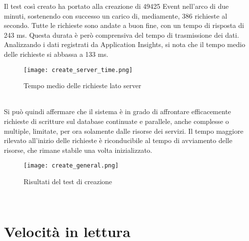 Il test così creato ha portato alla creazione di 49425 Event
nell'arco di due minuti, sostenendo con successo un carico di, mediamente,
386 richieste al secondo.
Tutte le richieste sono andate a buon fine, con un tempo di risposta di 243 ms.
Questa durata è però comprensiva del tempo di trasmissione dei dati.
Analizzando i dati registrati da Application Insights,
si nota che il tempo medio delle richieste si abbassa a 133 ms.\\
\begin{figure}[htbp]
    \begin{center}
        \texttt{[image: create\_server\_time.png]}
        \caption{Tempo medio delle richieste lato server}
    \end{center}
\end{figure}
\\
Si può quindi affermare che il sistema è in grado di affrontare efficacemente 
richieste di scritture sul database continuate e parallele, anche complesse o multiple,
limitate, per ora solamente dalle risorse dei servizi.
Il tempo maggiore rilevato all'inizio delle richieste è riconducibile al
tempo di avviamento delle risorse, che rimane stabile una volta inizializzato.
\\
\begin{figure}[htbp]
    \begin{center}
        \texttt{[image: create\_general.png]}
        \caption{Risultati del test di creazione}
    \end{center}
\end{figure}
\\
\clearpage

\section{Velocità in lettura}


